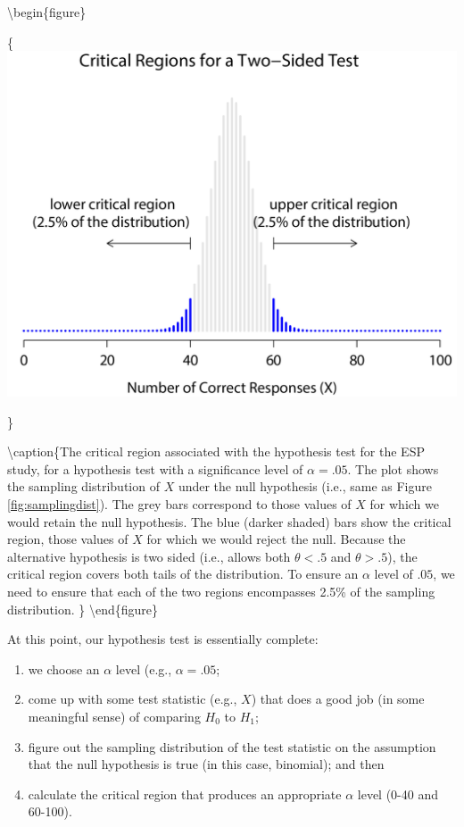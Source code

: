 \documentclass[
]{book}
\providecommand{\tightlist}{%
  \setlength{\itemsep}{0pt}\setlength{\parskip}{0pt}}
\begin{document}
\textbackslash begin\{figure\}

\{\centering \includegraphics[width=1\linewidth]{img/nhst/rejectionRegion1}

\}

\textbackslash caption\{The critical region associated with the hypothesis test for the ESP study, for a hypothesis test with a significance level of \(\alpha = .05\). The plot shows the sampling distribution of \(X\) under the null hypothesis (i.e., same as Figure \ref{fig:samplingdist}). The grey bars correspond to those values of \(X\) for which we would retain the null hypothesis. The blue (darker shaded) bars show the critical region, those values of \(X\) for which we would reject the null. Because the alternative hypothesis is two sided (i.e., allows both \(\theta <.5\) and \(\theta >.5\)), the critical region covers both tails of the distribution. To ensure an \(\alpha\) level of \(.05\), we need to ensure that each of the two regions encompasses 2.5\% of the sampling distribution. \}\label{fig:crit2}
\textbackslash end\{figure\}

At this point, our hypothesis test is essentially complete:

\begin{enumerate}
\def\labelenumi{\arabic{enumi}.}
\tightlist
\item
  we choose an \(\alpha\) level (e.g., \(\alpha = .05\);
\item
  come up with some test statistic (e.g., \(X\)) that does a good job (in some meaningful sense) of comparing \(H_0\) to \(H_1\);
\item
  figure out the sampling distribution of the test statistic on the assumption that the null hypothesis is true (in this case, binomial); and then
\item
  calculate the critical region that produces an appropriate \(\alpha\) level (0-40 and 60-100).
\end{enumerate}
\end{document}
